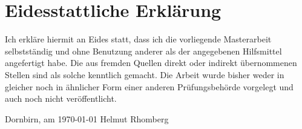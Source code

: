\documentclass[a4paper,12pt, twoside]{scrreprt}
\begin{document}
\clearpage
{}
{}
\printbibliography


\chapter*{Eidesstattliche Erklärung}
Ich erkläre hiermit an Eides statt, dass ich die vorliegende Masterarbeit selbstständig und ohne Benutzung anderer als der angegebenen Hilfsmittel angefertigt habe. Die aus fremden Quellen direkt oder indirekt übernommenen Stellen sind als solche kenntlich gemacht. Die Arbeit wurde bisher weder in gleicher noch in ähnlicher Form einer anderen Prüfungsbehörde vorgelegt und auch noch nicht veröffentlicht.

\vspace{3cm}
\noindent
Dornbirn, am \today %
\hfill Helmut Rhomberg %
\end{document}
